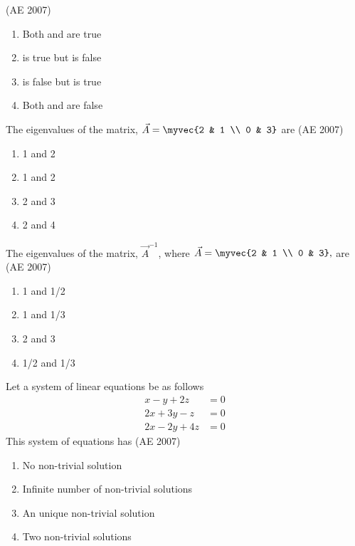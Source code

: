 \hfill (AE 2007)
    \begin{enumerate}
        \item Both  and  are true
        \item {} is true but  is false
        \item {} is false but  is true
        \item Both  and  are false
    \end{enumerate}
%
    \item The eigenvalues of the matrix, 
$	    \vec{A} =
    \myvec{2 & 1 \\
        0 & 3}
	$
    are 
\hfill (AE 2007)
    \begin{multicols}{4}
    \begin{enumerate}
        \item 1 and 2 
        \item 1 and 2
        \item 2 and 3 
        \item 2 and 4
    \end{enumerate}
    \end{multicols}
%
    \item The eigenvalues of the matrix, $\vec{A}^{-1}$, where 
	    $\vec{A} = \myvec{2 & 1 \\
    0 & 3},$
    are 
\hfill (AE 2007)
    \begin{multicols}{4}
    \begin{enumerate}
        \item 1 and 1/2 
        \item 1 and 1/3
        \item 2 and 3 
        \item 1/2 and 1/3
    \end{enumerate}
    \end{multicols}
    \item Let a system of linear equations be as follows
    \begin{align*}
        x - y + 2z &= 0 \\
        2x + 3y - z &= 0 \\
        2x - 2y + 4z &= 0
    \end{align*}
    This system of equations has
\hfill (AE 2007)
    \begin{enumerate}
        \item No non-trivial solution
        \item Infinite number of non-trivial solutions
        \item An unique non-trivial solution
        \item Two non-trivial solutions
    \end{enumerate}
